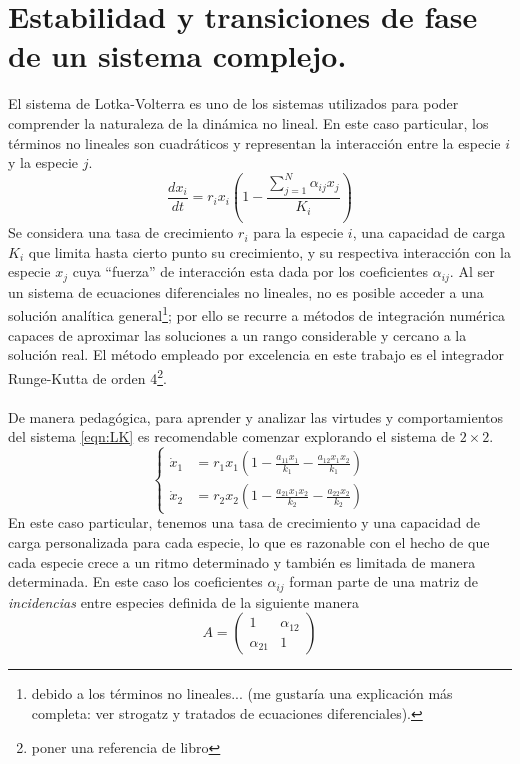 \chapter{Estabilidad y transiciones de fase de un sistema complejo.}

El sistema de Lotka-Volterra es uno de los sistemas utilizados para poder comprender la naturaleza de la dinámica no lineal. En este caso particular, los términos no lineales son cuadráticos y representan la interacción entre la especie $i$ y la especie $j$. 
\begin{equation}\label{eqn:LK}
	\frac{dx_i}{dt}=r_ix_i\left(1-\frac{\sum_{j=1}^N \alpha_{ij}x_j}{K_i}\right)
\end{equation}
Se considera una tasa de crecimiento $r_i$ para la especie $i$, una capacidad de carga $K_i$ que limita hasta cierto punto su crecimiento, y su respectiva interacción con la especie $x_j$ cuya ``fuerza'' de interacción esta dada por los coeficientes $\alpha_{ij}$. Al ser un sistema de ecuaciones diferenciales no lineales, no es posible acceder a una solución analítica general\footnote{debido a los términos no lineales... (me gustaría una explicación más completa: ver strogatz y tratados de ecuaciones diferenciales).}; por ello se recurre a métodos de integración numérica capaces de aproximar las soluciones a un rango considerable y cercano a la solución real. El método empleado por excelencia en este trabajo es el integrador Runge-Kutta de orden 4\footnote{poner una referencia de libro}.\\
\\
De manera pedagógica, para aprender y analizar las virtudes y comportamientos del sistema \ref{eqn:LK} es recomendable comenzar explorando el sistema de $2\times 2$.
$$
\begin{cases}
	\dot{x}_1&=r_1x_1(1-\frac{a_{11}x_1}{k_1}-\frac{a_{12}x_1x_2}{k_1})\\
	\dot{x}_2&=r_2x_2(1-\frac{a_{21}x_1x_2}{k_2}-\frac{a_{22}x_2}{k_2})
\end{cases}
$$
En este caso particular, tenemos una tasa de crecimiento y una capacidad de carga personalizada para cada especie, lo que es razonable con el hecho de que cada especie crece a un ritmo determinado y también es limitada de manera determinada. En este caso los coeficientes $\alpha_{ij}$ forman parte de una matriz de \textit{incidencias} entre especies definida de la siguiente manera
\begin{equation}\label{eqn:mIncidencias}
	A=
	\begin{pmatrix}
		1 & \alpha_{12}\\
		\alpha_{21} &1
	\end{pmatrix}
\end{equation}

